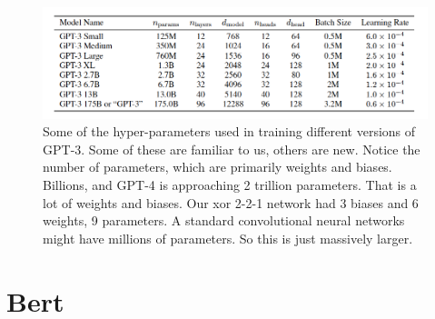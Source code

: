 \begin{figure}[h]
\centering
\includegraphics[scale=.4]{./images/gpt3_params.png}
\caption[GPT Technical report. Todo]{Some of the hyper-parameters used in training different versions of GPT-3. Some of these are familiar to us, others are new. Notice the number of parameters, which are primarily weights and biases.  Billions, and GPT-4 is approaching 2 trillion parameters.  That is a lot of weights and biases.  Our xor 2-2-1 network had 3 biases and 6 weights, 9 parameters.  A standard convolutional neural networks might have millions of parameters. So this is just massively larger. }
\label{gptParams}
\end{figure}

\section{Bert}\label{sect_bert}

